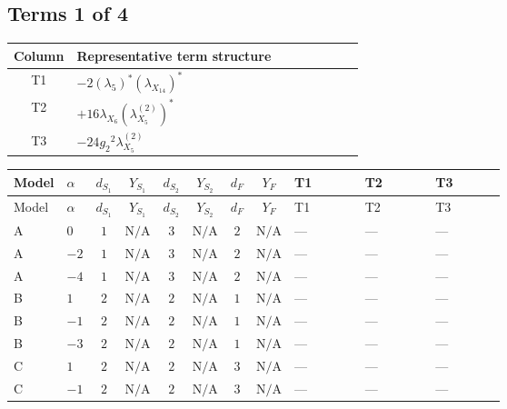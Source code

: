 \documentclass[8pt]{article}
\begin{document}
\begin{landscape}
\subsection*{Terms 1 of 4}
\begin{center}
\begin{tabular}{@{}c >{\raggedright\arraybackslash}p{0.82\linewidth}@{}}
\toprule
Column & Representative term structure \\
\midrule
T1 & \(\displaystyle -2 \left({\lambda_5}\right)^{*} \left({\lambda_{X_{14}}}\right)^{*}\) \\
\midrule
T2 & \(\displaystyle +16 {\lambda_{X_{6}}} \left({\lambda_{X_{5}}^{(2)}}\right)^{*}\) \\
\midrule
T3 & \(\displaystyle -24 {g_2}^2 {\lambda_{X_{5}}^{(2)}}\) \\
\midrule
\bottomrule
\end{tabular}
\end{center}
\smallskip
\tiny
\begin{longtable}{@{}llcccccc >{\raggedright\arraybackslash}p{0.21\linewidth} >{\raggedright\arraybackslash}p{0.21\linewidth} >{\raggedright\arraybackslash}p{0.21\linewidth}@{}}
\toprule
Model & $\alpha$ & $d_{S_1}$ & $Y_{S_1}$ & $d_{S_2}$ & $Y_{S_2}$ & $d_F$ & $Y_F$ & T1 & T2 & T3 \\
\midrule
\endfirsthead
\toprule
Model & $\alpha$ & $d_{S_1}$ & $Y_{S_1}$ & $d_{S_2}$ & $Y_{S_2}$ & $d_F$ & $Y_F$ & T1 & T2 & T3 \\
\midrule
\endhead
A & $0$ & $1$ & $\text{N/A}$ & $3$ & $\text{N/A}$ & $2$ & $\text{N/A}$ & --- & --- & --- \\
\midrule
A & $-2$ & $1$ & $\text{N/A}$ & $3$ & $\text{N/A}$ & $2$ & $\text{N/A}$ & --- & --- & --- \\
\midrule
A & $-4$ & $1$ & $\text{N/A}$ & $3$ & $\text{N/A}$ & $2$ & $\text{N/A}$ & --- & --- & --- \\
\midrule
B & $1$ & $2$ & $\text{N/A}$ & $2$ & $\text{N/A}$ & $1$ & $\text{N/A}$ & --- & --- & --- \\
\midrule
B & $-1$ & $2$ & $\text{N/A}$ & $2$ & $\text{N/A}$ & $1$ & $\text{N/A}$ & --- & --- & --- \\
\midrule
B & $-3$ & $2$ & $\text{N/A}$ & $2$ & $\text{N/A}$ & $1$ & $\text{N/A}$ & --- & --- & --- \\
\midrule
C & $1$ & $2$ & $\text{N/A}$ & $2$ & $\text{N/A}$ & $3$ & $\text{N/A}$ & --- & --- & --- \\
\midrule
C & $-1$ & $2$ & $\text{N/A}$ & $2$ & $\text{N/A}$ & $3$ & $\text{N/A}$ & --- & --- & --- \\

\end{longtable}
\end{landscape}
\end{document}
